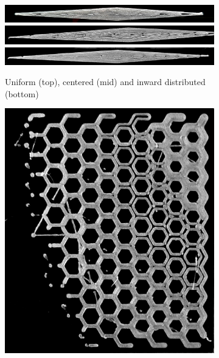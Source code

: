 \begin{figure}
\centering
\begin{subfigure}{\columnwidth}\centering
\setlength{\figwidth}{\columnwidth}
\includegraphics[width=\figwidth]{sources-applications-P3-print-wedge-naive-edited.png}
\includegraphics[width=\figwidth]{sources-applications-P3-print-wedge-center-edited.png}
\includegraphics[width=\figwidth]{sources-applications-P3-print-wedge-inward-edited.png}
\caption{Uniform (top), centered (mid) and inward distributed (bottom)}\label{wedge_print}
\end{subfigure}
\setlength{\figheight}{.38\columnwidth}
\setlength{\figheightTwo}{.47\columnwidth}
\setlength{\figwidth}{0.32\columnwidth}
\begin{subfigure}{\figwidth}\centering
\includegraphics[height=\figheight]{sources-applications-P3-print-hex-naive-edited.png}

\end{subfigure}
\end{figure}
